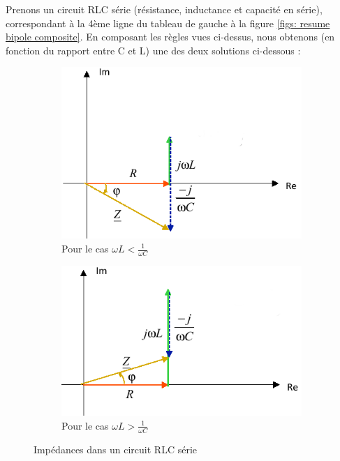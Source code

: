 \documentclass[12pt,a4paper]{article}
\begin{document}
\begin{exemple}
	Prenons un circuit RLC série (résistance, inductance et capacité en série), correspondant à la 4ème ligne du tableau de gauche à la figure \ref{figs: resume bipole composite}. En composant les règles vues ci-dessus, nous obtenons (en fonction du rapport entre C et L) une des deux solutions ci-dessous :
\end{exemple}
	\begin{figure}[!h]
		\centering
			\begin{subfigure}[b]{0.45\textwidth}
			\centering
			\includegraphics[scale=0.6]{images/impedance_petitL}
			\caption{Pour le cas $\omega L < \frac{1}{\omega C}$}
		\end{subfigure}
			\begin{subfigure}[b]{0.32\textwidth}
			\centering
			\includegraphics[scale=0.6]{images/impedance_grandL}
			\caption{Pour le cas $\omega L > \frac{1}{\omega C}$}
		\end{subfigure}
		\caption{Impédances dans un circuit RLC série}
	\end{figure}
\end{document}
